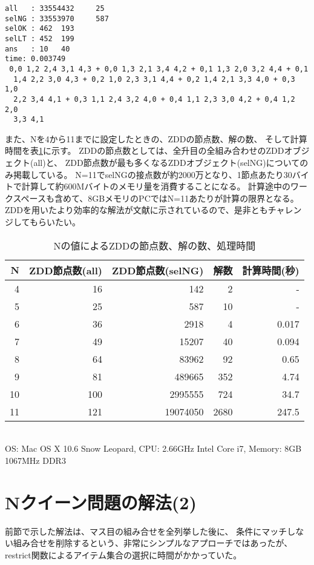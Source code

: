 \begin{Verbatim}[baselinestretch=0.7,frame=single]
all   : 33554432	 25
selNG : 33553970	 587
selOK : 462	 193
selLT : 452	 199
ans   : 10	 40
time: 0.003749
 0,0 1,2 2,4 3,1 4,3 + 0,0 1,3 2,1 3,4 4,2 + 0,1 1,3 2,0 3,2 4,4 + 0,1
  1,4 2,2 3,0 4,3 + 0,2 1,0 2,3 3,1 4,4 + 0,2 1,4 2,1 3,3 4,0 + 0,3 1,0
  2,2 3,4 4,1 + 0,3 1,1 2,4 3,2 4,0 + 0,4 1,1 2,3 3,0 4,2 + 0,4 1,2 2,0
  3,3 4,1
\end{Verbatim}

また、Nを4から11までに設定したときの、ZDDの節点数、解の数、
そして計算時間を表\ref{tbl:tut_nqueen_result}に示す。
ZDDの節点数としては、全升目の全組み合わせのZDDオブジェクト(all)と、
ZDD節点数が最も多くなるZDDオブジェクト(selNG)についてのみ掲載している。
N=11でselNGの接点数が約2000万となり、1節点あたり30バイトで計算して約600Mバイトのメモリ量を消費することになる。
計算途中のワークスペースも含めて、8GBメモリのPCではN=11あたりが計算の限界となる。
ZDDを用いたより効率的な解法が文献\cite{okumura1995}に示されているので、是非ともチャレンジしてもらいたい。

\begin{table}
\begin{center}
\caption{Nの値によるZDDの節点数、解の数、処理時間\label{tbl:tut_nqueen_result}}
\begin{tabular}{r|r|r|r|r}
\hline
N & ZDD節点数(all) & ZDD節点数(selNG) & 解数 & 計算時間(秒) \\
\hline
4 &  16 &      142 &    2 & - \\
5 &  25 &      587 &   10 & - \\
6 &  36 &     2918 &    4 & 0.017 \\
7 &  49 &    15207 &   40 & 0.094 \\
8 &  64 &    83962 &   92 & 0.65 \\
9 &  81 &   489665 &  352 & 4.74 \\
10& 100 &  2995555 &  724 & 34.7 \\
11& 121 & 19074050 & 2680 & 247.5 \\
\hline
\end{tabular}
\\
{\scriptsize *OS: Mac OS X 10.6 Snow Leopard, CPU: 2.66GHz Intel Core i7, Memory: 8GB 1067MHz DDR3}\\
\end{center}
\end{table}

\section{Nクイーン問題の解法(2)}
前節で示した解法は、マス目の組み合せを全列挙した後に、
条件にマッチしない組み合せを削除するという、非常にシンプルなアプローチではあったが、
restrict関数によるアイテム集合の選択に時間がかかっていた。

